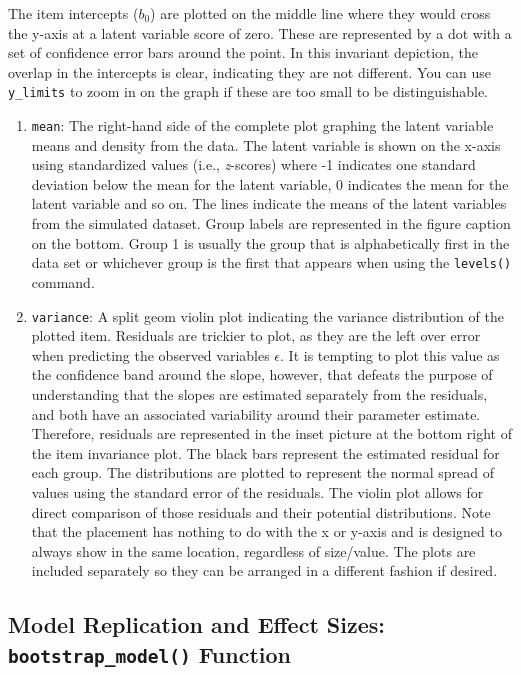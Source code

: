 \documentclass[
  man]{apa7}
\begin{document}
The item intercepts (\(b_0\)) are plotted on the middle line where they would cross the y-axis at a latent variable score of zero. These are represented by a dot with a set of confidence error bars around the point. In this invariant depiction, the overlap in the intercepts is clear, indicating they are not different. You can use \texttt{y\_limits} to zoom in on the graph if these are too small to be distinguishable.

\begin{enumerate}
\def\labelenumi{\arabic{enumi})}
\setcounter{enumi}{2}
\item
  \texttt{mean}: The right-hand side of the complete plot graphing the latent variable means and density from the data. The latent variable is shown on the x-axis using standardized values (i.e., \emph{z}-scores) where -1 indicates one standard deviation below the mean for the latent variable, 0 indicates the mean for the latent variable and so on. The lines indicate the means of the latent variables from the simulated dataset. Group labels are represented in the figure caption on the bottom. Group 1 is usually the group that is alphabetically first in the data set or whichever group is the first that appears when using the \texttt{levels()} command.
\item
  \texttt{variance}: A split geom violin plot indicating the variance distribution of the plotted item. Residuals are trickier to plot, as they are the left over error when predicting the observed variables \(\epsilon\). It is tempting to plot this value as the confidence band around the slope, however, that defeats the purpose of understanding that the slopes are estimated separately from the residuals, and both have an associated variability around their parameter estimate. Therefore, residuals are represented in the inset picture at the bottom right of the item invariance plot. The black bars represent the estimated residual for each group. The distributions are plotted to represent the normal spread of values using the standard error of the residuals. The violin plot allows for direct comparison of those residuals and their potential distributions. Note that the placement has nothing to do with the x or y-axis and is designed to always show in the same location, regardless of size/value. The plots are included separately so they can be arranged in a different fashion if desired.
\end{enumerate}

\subsection{\texorpdfstring{Model Replication and Effect Sizes: \texttt{bootstrap\_model()} Function}{Model Replication and Effect Sizes: bootstrap\_model() Function}}\label{model-replication-and-effect-sizes-bootstrap_model-function}
\end{document}
